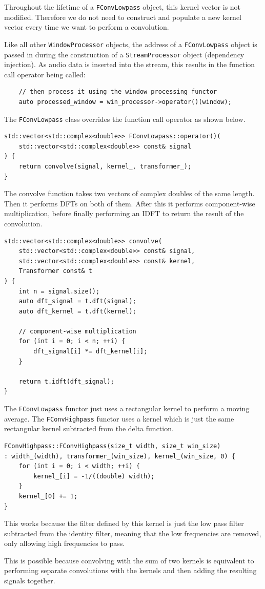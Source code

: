 Throughout the lifetime of a \verb|FConvLowpass| object, 
this kernel vector is not modified.
Therefore we do not need to construct and populate a new kernel vector 
every time we want to perform a convolution.

Like all other \verb|WindowProcessor| objects, the address of a
\verb|FConvLowpass| object is passed in during the construction of a
\verb|StreamProcessor| object (dependency injection).
As audio data is inserted into the stream, this results in the
function call operator being called:

\begin{verbatim}
    // then process it using the window processing functor
    auto processed_window = win_processor->operator()(window);
\end{verbatim}

The \verb|FConvLowpass| class overrides the function call operator as shown below.

\begin{verbatim}
std::vector<std::complex<double>> FConvLowpass::operator()(
    std::vector<std::complex<double>> const& signal
) {
    return convolve(signal, kernel_, transformer_);
}
\end{verbatim}

\pagebreak

The convolve function takes two vectors of complex doubles of the same length.
Then it performs DFTs on both of them.
After this it performs component-wise multiplication, before finally
performing an IDFT to return the result of the convolution.

\begin{verbatim}
std::vector<std::complex<double>> convolve(
    std::vector<std::complex<double>> const& signal,
    std::vector<std::complex<double>> const& kernel,
    Transformer const& t
) {
    int n = signal.size();
    auto dft_signal = t.dft(signal);
    auto dft_kernel = t.dft(kernel);

    // component-wise multiplication
    for (int i = 0; i < n; ++i) {
        dft_signal[i] *= dft_kernel[i];
    }

    return t.idft(dft_signal);
}
\end{verbatim}

The \verb|FConvLowpass| functor just uses a rectangular kernel to perform
a moving average. 
The \verb|FConvHighpass| functor uses a kernel which is just the same rectangular
kernel subtracted from the delta function.

\begin{verbatim}
FConvHighpass::FConvHighpass(size_t width, size_t win_size) 
: width_(width), transformer_(win_size), kernel_(win_size, 0) {
    for (int i = 0; i < width; ++i) {
        kernel_[i] = -1/((double) width);
    }
    kernel_[0] += 1;
}
\end{verbatim}

This works because the filter defined by this kernel is just the
low pass filter subtracted from the identity filter, 
meaning that the low frequencies are removed, only allowing high frequencies to pass.

This is possible because convolving with the sum of two kernels is
equivalent to performing separate convolutions with the kernels and then
adding the resulting signals together.
